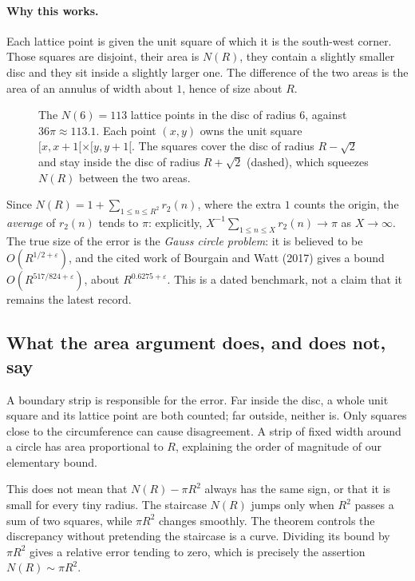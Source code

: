 \paragraph{Why this works.}
Each lattice point is given the unit square of which it is the south-west corner. Those squares are disjoint, their area is $N(R)$, they contain a slightly smaller disc and they sit inside a slightly larger one. The difference of the two areas is the area of an annulus of width about $1$, hence of size about $R$.

\begin{figure}[ht]
\centering
{}
\caption{The $N(6)=113$ lattice points in the disc of radius $6$, against $36\pi\approx113.1$. Each point $(x,y)$ owns the unit square $[x,x+1[\times[y,y+1[$. The squares cover the disc of radius $R-\sqrt2$ and stay inside the disc of radius $R+\sqrt2$ (dashed), which squeezes $N(R)$ between the two areas.}
\label{fig:disc}
\end{figure}

Since $N(R)=1+\sum_{1\le n\le R^2}r_2(n)$, where the extra $1$ counts the origin, the \emph{average} of $r_2(n)$ tends to $\pi$: explicitly, $X^{-1}\sum_{1\le n\le X}r_2(n)\to\pi$ as $X\to\infty$. The true size of the error is the \emph{Gauss circle problem}: it is believed to be $O(R^{1/2+\varepsilon})$, and the cited work of Bourgain and Watt (2017) gives a bound $O(R^{517/824+\varepsilon})$, about $R^{0.6275+\varepsilon}$. This is a dated benchmark, not a claim that it remains the latest record.

\subsection*{What the area argument does, and does not, say}
A boundary strip is responsible for the error. Far inside the disc, a whole unit square and its lattice point are both counted; far outside, neither is. Only squares close to the circumference can cause disagreement. A strip of fixed width around a circle has area proportional to $R$, explaining the order of magnitude of our elementary bound.

This does not mean that $N(R)-\pi R^2$ always has the same sign, or that it is small for every tiny radius. The staircase $N(R)$ jumps only when $R^2$ passes a sum of two squares, while $\pi R^2$ changes smoothly. The theorem controls the discrepancy without pretending the staircase is a curve. Dividing its bound by $\pi R^2$ gives a relative error tending to zero, which is precisely the assertion $N(R)\sim\pi R^2$.

